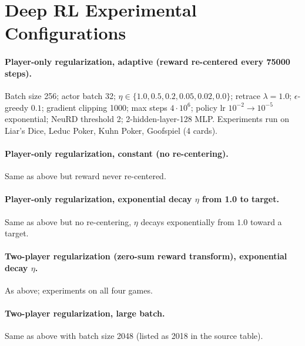 \section{Deep RL Experimental Configurations}

\paragraph{Player-only regularization, adaptive (reward re-centered every 75000 steps).}
Batch size 256; actor batch 32; $\eta\in\{1.0, 0.5, 0.2, 0.05, 0.02, 0.0\}$; retrace $\lambda=1.0$; $\epsilon$-greedy $0.1$; gradient clipping 1000; max steps $4\cdot 10^6$; policy lr $10^{-2}\to 10^{-5}$ exponential; NeuRD threshold 2; 2-hidden-layer-128 MLP. Experiments run on Liar's Dice, Leduc Poker, Kuhn Poker, Goofspiel (4 cards).

\paragraph{Player-only regularization, constant (no re-centering).}
Same as above but reward never re-centered.

\paragraph{Player-only regularization, exponential decay $\eta$ from 1.0 to target.}
Same as above but no re-centering, $\eta$ decays exponentially from $1.0$ toward a target.

\paragraph{Two-player regularization (zero-sum reward transform), exponential decay $\eta$.}
As above; experiments on all four games.

\paragraph{Two-player regularization, large batch.}
Same as above with batch size 2048 (listed as 2018 in the source table).
